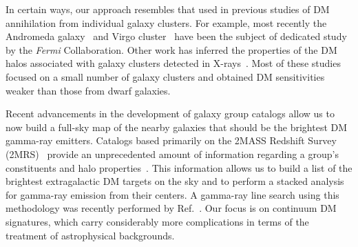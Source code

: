 In certain ways, our approach resembles that used in previous studies  of DM annihilation from individual galaxy clusters.  For example, most recently the Andromeda galaxy~\cite{Ackermann:2017nya} and Virgo cluster~\cite{Ackermann:2015fdi} have been the subject of dedicated study by the \emph{Fermi} Collaboration.  Other work has inferred the properties of the DM halos associated with galaxy clusters detected in X-rays~\cite{Ackermann:2010rg, Ando:2012vu,Ackermann:2013iaq,Anderson:2015dpc,Rephaeli:2015nca,2016A&A...589A..33A,Liang:2016pvm}.  Most of these studies focused on a small number of galaxy clusters and obtained DM sensitivities weaker than those from dwarf galaxies.  

Recent advancements in the development of galaxy group catalogs allow us to now build a full-sky map of the nearby galaxies that should be the brightest DM gamma-ray emitters.  Catalogs based primarily on the 2MASS Redshift Survey (2MRS)~\cite{ Huchra:2011ii} provide an unprecedented amount of information regarding a group's constituents and halo properties~\cite{Tully:2015opa,2017ApJ...843...16K,Lu:2016vmu}.  This information allows us to build a list of the brightest extragalactic DM targets on the sky and to perform a stacked analysis for gamma-ray emission from their centers.  A gamma-ray line search using this methodology was recently performed by Ref.~\cite{Adams:2016alz}.  Our focus is on continuum DM signatures, which carry considerably more complications in terms of the treatment of astrophysical backgrounds.  

